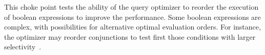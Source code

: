 
This choke point tests the ability of the query optimizer to reorder the
execution of boolean expressions to improve the performance. Some boolean
expressions are complex, with possibilities for alternative optimal evaluation
orders. For instance, the optimizer may reorder conjunctions to test first those
conditions with larger selectivity~\cite{DBLP:conf/vldb/Moerkotte98}.


